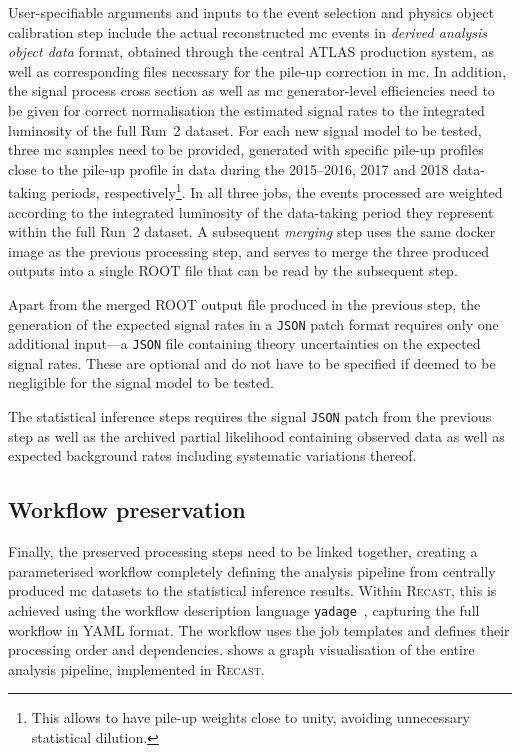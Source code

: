 User-specifiable arguments and inputs to the event selection and physics object calibration step include the actual reconstructed \gls{mc} events in \textit{derived analysis object data} format, obtained through the central ATLAS production system, as well as corresponding files necessary for the pile-up correction in \gls{mc}. In addition, the signal process cross section as well as \gls{mc} generator-level efficiencies need to be given for correct normalisation the estimated signal rates to the integrated luminosity of the full Run~2 dataset. For each new signal model to be tested, three \gls{mc} samples need to be provided, generated with specific pile-up profiles close to the pile-up profile in data during the 2015--2016, 2017 and 2018 data-taking periods, respectively\footnote{This allows to have pile-up weights close to unity, avoiding unnecessary statistical dilution.}. In all three jobs, the events processed are weighted according to the integrated luminosity of the data-taking period they represent within the full Run~2 dataset. A subsequent \textit{merging} step uses the same docker image as the previous processing step, and serves to merge the three produced outputs into a single \textsc{ROOT} file that can be read by the subsequent step.

Apart from the merged \textsc{ROOT} output file produced in the previous step, the generation of the expected signal rates in a \texttt{JSON} patch format requires only one additional input---a \texttt{JSON} file containing theory uncertainties on the expected signal rates. These are optional and do not have to be specified if deemed to be negligible for the signal model to be tested.

The statistical inference steps requires the signal \texttt{JSON} patch from the previous step as well as the archived partial likelihood containing observed data as well as expected background rates including systematic variations thereof. 

\subsection{Workflow preservation}

Finally, the preserved processing steps need to be linked together, creating a parameterised workflow completely defining the analysis pipeline from centrally produced \gls{mc} datasets to the statistical inference results. Within \textsc{Recast}, this is achieved using the workflow description language \texttt{yadage}~\cite{yadage:2017frf}, capturing the full workflow in YAML format. The workflow uses the job templates and defines their processing order and dependencies.  shows a graph visualisation of the entire analysis pipeline, implemented in \textsc{Recast}. 

